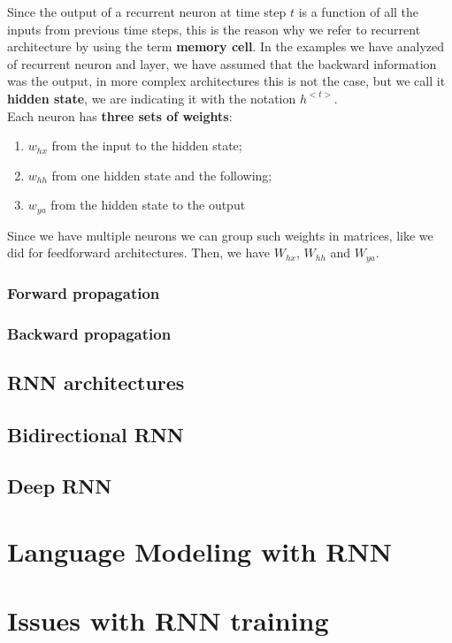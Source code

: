 Since the output of a recurrent neuron at time step $t$ is a function of all the inputs from previous time steps, this is the reason why we refer to recurrent architecture by using the term \textbf{memory cell}. In the examples we have analyzed of recurrent neuron and layer, we have assumed that the backward information was the output, in more complex architectures this is not the case, but we call it \textbf{hidden state}, we are indicating it with the notation $h^{<t>}$.\\
Each neuron has \textbf{three sets of weights}: 
\begin{enumerate}
    \itemsep-0.2em
    \item $w_{hx}$ from the input to the hidden state; 
    \item $w_{hh}$ from one hidden state and the following; 
    \item $w_{ya}$ from the hidden state to the output
\end{enumerate} 
Since we have multiple neurons we can group such weights in matrices, like we did for feedforward architectures. Then, we have $W_{hx}$, $W_{hh}$ and $W_{ya}$. 

\subsubsection{Forward propagation}

\subsubsection{Backward propagation}

\subsection{RNN architectures}

\subsection{Bidirectional RNN}

\subsection{Deep RNN}

\section{Language Modeling with RNN}

\section{Issues with RNN training}

